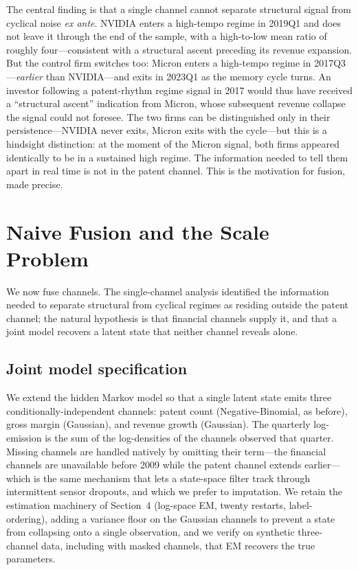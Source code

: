 \documentclass[11pt]{article}
\begin{document}
The central finding is that a single channel cannot separate structural signal from cyclical noise \emph{ex ante}. NVIDIA enters a high-tempo regime in 2019Q1 and does not leave it through the end of the sample, with a high-to-low mean ratio of roughly four---consistent with a structural ascent preceding its revenue expansion. But the control firm switches too: Micron enters a high-tempo regime in 2017Q3---\emph{earlier} than NVIDIA---and exits in 2023Q1 as the memory cycle turns. An investor following a patent-rhythm regime signal in 2017 would thus have received a ``structural ascent'' indication from Micron, whose subsequent revenue collapse the signal could not foresee. The two firms can be distinguished only in their persistence---NVIDIA never exits, Micron exits with the cycle---but this is a hindsight distinction: at the moment of the Micron signal, both firms appeared identically to be in a sustained high regime. The information needed to tell them apart in real time is not in the patent channel. This is the motivation for fusion, made precise.

\section{Naive Fusion and the Scale Problem}

We now fuse channels. The single-channel analysis identified the information needed to separate structural from cyclical regimes as residing outside the patent channel; the natural hypothesis is that financial channels supply it, and that a joint model recovers a latent state that neither channel reveals alone.

\subsection{Joint model specification}

We extend the hidden Markov model so that a single latent state emits three conditionally-independent channels: patent count (Negative-Binomial, as before), gross margin (Gaussian), and revenue growth (Gaussian). The quarterly log-emission is the sum of the log-densities of the channels observed that quarter. Missing channels are handled natively by omitting their term---the financial channels are unavailable before 2009 while the patent channel extends earlier---which is the same mechanism that lets a state-space filter track through intermittent sensor dropouts, and which we prefer to imputation. We retain the estimation machinery of Section~4 (log-space EM, twenty restarts, label-ordering), adding a variance floor on the Gaussian channels to prevent a state from collapsing onto a single observation, and we verify on synthetic three-channel data, including with masked channels, that EM recovers the true parameters.
\end{document}
